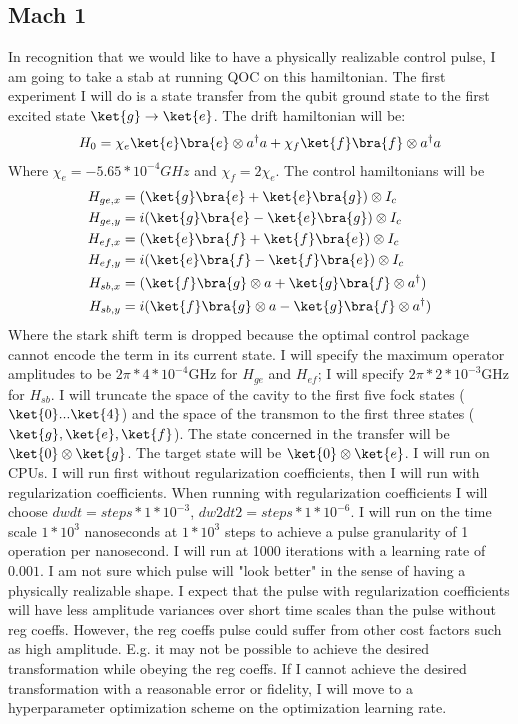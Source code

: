 \documentclass[letterpaper, 12pt]{article}
\begin{document}
\subsection{Mach 1}
In recognition that we would like to have a physically realizable control pulse, I am going to take a stab at running QOC on this hamiltonian. The first experiment I will do is a state transfer from the qubit ground state to the first excited state $\ket{g} \rightarrow \ket{e}$.
The drift hamiltonian will be:
\begin{align*}
  H_{0} = \chi_{e}\ket{e}\bra{e} \otimes a^{\dagger}a + \chi_{f}\ket{f}\bra{f} \otimes a^{\dagger}a\\
\end{align*}
Where $\chi_{e} = -5.65*10^{-4} GHz$ and $\chi_{f} = 2 \chi_{e}$.
The control hamiltonians will be
\begin{align*}
  H_{ge, x} &= (\ket{g}\bra{e} + \ket{e}\bra{g}) \otimes I_{c}\\
  H_{ge, y} &= i(\ket{g}\bra{e}- \ket{e}\bra{g}) \otimes I_{c}\\
  H_{ef, x} &= (\ket{e}\bra{f} + \ket{f}\bra{e}) \otimes I_{c}\\
  H_{ef, y} &= i(\ket{e}\bra{f} - \ket{f}\bra{e}) \otimes I_{c}\\
  H_{sb, x} &= (\ket{f}\bra{g} \otimes a + \ket{g}\bra{f} \otimes a^{\dagger})\\
  H_{sb, y} &= i(\ket{f}\bra{g} \otimes a - \ket{g}\bra{f} \otimes a^{\dagger})\\
\end{align*}
Where the stark shift term is dropped because the optimal control package cannot encode the term in its current state. I will specify the maximum operator amplitudes to be $2\pi*4*10^{-4}$GHz for $H_{ge}$ and $H_{ef}$; I will specify $2\pi*2*10^{-3}$GHz for $H_{sb}$. I will truncate the space of the cavity to the first five fock states ($\ket{0} ... \ket{4}$) and the space of the transmon to the first three states ($\ket{g}, \ket{e}, \ket{f}$). The state concerned in the transfer will be $\ket{0} \otimes \ket{g}$. The target state will be $\ket{0} \otimes \ket{e}$. I will run on CPUs. I will run first without regularization coefficients, then I will run with regularization coefficients. When running with regularization coefficients I will choose $dwdt = steps * 1*10^{-3}$, $dw2dt2 = steps * 1*10^{-6}$. I will run on the time scale $1*10^{3}$ nanoseconds at $1*10^{3}$ steps to achieve a pulse granularity of 1 operation per nanosecond. I will run at 1000 iterations with a learning rate of $0.001$.
I am not sure which pulse will "look better" in the sense of having a physically realizable shape. I expect that the pulse with regularization coefficients will have less amplitude variances over short time scales than the pulse without reg coeffs. However, the reg coeffs pulse could suffer from other cost factors such as high amplitude. E.g. it may not be possible to achieve the desired transformation while obeying the reg coeffs. If I cannot achieve the desired transformation with a reasonable error or fidelity, I will move to a hyperparameter optimization scheme on the optimization learning rate.
\end{document}
